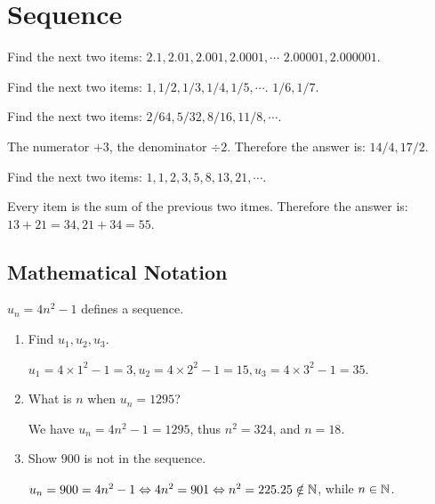 \documentclass[8pt]{article}
\author{\Author}
\title{\Title}
\date{\Date}
\begin{document}
	\maketitle

	\tableofcontents

	\section{Sequence}

		\exmp {} Find the next two items: \(2.1, 2.01, 2.001, 2.0001, \cdots\) \(2.00001, 2.000001\).

		\exmp {} Find the next two items: \(1, 1/2, 1/3, 1/4, 1/5, \cdots\). \(1/6, 1/7\).\newline

		\prob Find the next two items: \(2/64, 5/32, 8/16, 11/8, \cdots\).
		
		\solution The numerator \(+3\), the denominator \(\div 2\). Therefore the answer is: \(14/4, 17/2\).\newline

		\prob Find the next two items: \(1, 1, 2, 3, 5, 8, 13, 21, \cdots\).
		
		\solution Every item is the sum of the previous two itmes. Therefore the answer is: \(13 + 21 = 34, 21 + 34 = 55\).

		\subsection{Mathematical Notation}

			\prob \(u_n = 4n^2 - 1\) defines a sequence.
			
			\begin{enumerate}[label=\probword{(\arabic*)}]
				\item Find \(u_1, u_2, u_3\).
				
				\solution \(u_1 = 4 \times 1^2 - 1 = 3, u_2 = 4 \times 2^2 - 1 = 15, u_3 = 4 \times 3^2 - 1 = 35\).

				\item What is \(n\) when \(u_n = 1295\)?
				
				\solution We have \(u_n = 4n^2 - 1 = 1295\), thus \(n^2 = 324\), and \(n = 18\).

				\item Show \(900\) is not in the sequence.
				
				\solution \(u_n = 900 = 4n^2 - 1 \Leftrightarrow 4n^2 = 901 \Leftrightarrow n^2 = 225.25 \notin \mathbb{N}\), while \(n \in \mathbb{N}\).
			\end{enumerate}
\end{document}
